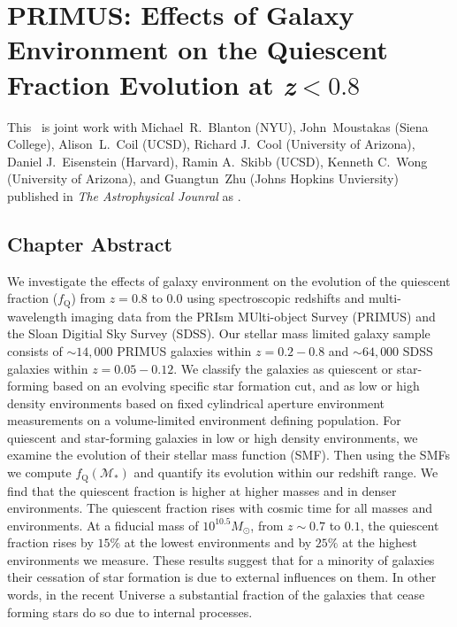 \def \HgA {H$\gamma_A$}
\def \Hbp {H$\beta ^\prime$}
\def \lowenvthresh {0.0}
\def \highenvthresh {3.0}
\def \apradius{2.5}
\def \apheight{35}

\chapter{PRIMUS: Effects of Galaxy Environment on the Quiescent Fraction Evolution at \lowercase{\textit{z}}$<0.8$ }


This \paper\ is joint work with Michael~R.~Blanton (NYU), John~Moustakas (Siena College), 
Alison~L.~Coil (UCSD), Richard J.~Cool (University of Arizona), Daniel J.~Eisenstein (Harvard),
Ramin A.~Skibb (UCSD), Kenneth C.~Wong (University of Arizona), and Guangtun~Zhu (Johns Hopkins Unviersity)
published in \emph{The Astrophysical Jounral} as \cite{Hahn:2015aa}. 

\section{Chapter Abstract}
We investigate the effects of galaxy environment on the evolution of
the quiescent fraction ($f_{\mathrm{Q}}$) from $z =0.8 $ to $ 0.0$ using
spectroscopic redshifts and multi-wavelength imaging data from the
PRIsm MUlti-object Survey (PRIMUS) and the Sloan Digitial Sky Survey
(SDSS). Our stellar mass limited galaxy sample consists of $\sim
14,000$ PRIMUS galaxies within $z = 0.2-0.8$ and $\sim 64,000$ SDSS
galaxies within $z = 0.05-0.12$. We classify the galaxies as quiescent
or star-forming based on an evolving specific star formation cut, and
as low or high density environments based on fixed cylindrical
aperture environment measurements on a volume-limited environment
defining population. For quiescent and
star-forming galaxies in low or high density environments, we examine
the evolution of their stellar mass function (SMF). Then using the
SMFs we compute $f_{\mathrm{Q}}(\mathcal{M}_{*})$ and quantify its
evolution within our redshift range. We find that the quiescent
fraction is higher at higher masses and in denser environments. The
quiescent fraction rises with cosmic time for all masses and
environments. At a fiducial mass of $10^{10.5}M_\odot$, from $z\sim
0.7$ to $0.1$, the quiescent fraction rises by $15\%$ at the
lowest environments and by $25\%$ at the highest environments we measure.
These results suggest that for a minority of galaxies their cessation
of star formation is due to external influences on
them. In other words, in the recent Universe a substantial fraction of the
galaxies that cease forming stars do so due to internal processes.

